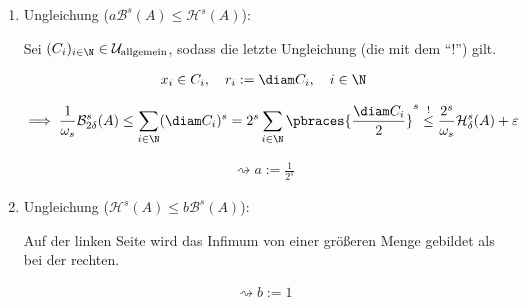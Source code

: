 \begin{solution}
\begin{enumerate}[label = \arabic*.]
    \begin{enumerate}[label = \arabic*.]

        \item Ungleichung ($a \mathcal{B}^s(A) \leq \mathcal{H}^s(A)$):
        
        Sei $(C_i)_{i \in \N} \in \mathcal{U}_\text{allgemein}$, sodass die letzte Ungleichung (die mit dem \enquote{!}) gilt.

        \begin{align*}
            x_i \in C_i,
            \quad
            r_i := \diam C_i,
            \quad
            i \in \N
        \end{align*}

        \begin{align*}
            \implies
            \frac{1}{\omega_s}
            \mathcal{B}_{2 \delta}^s(A)
            \leq
            \sum_{i \in \N}
                (\diam C_i)^s
            =
            2^s
            \sum_{i \in \N}
                \pbraces
                {
                    \frac{\diam C_i}{2}
                }^s
            \stackrel{!}{\leq}
            \frac{2^s}{\omega_s}
            \mathcal{H}_\delta^s(A) + \varepsilon
        \end{align*}

        \begin{align*}
            \rightsquigarrow
            a := \frac{1}{2^s}
        \end{align*}

        \item Ungleichung ($\mathcal{H}^s(A) \leq b \mathcal{B}^s(A)$):
        
        Auf der linken Seite wird das Infimum von einer größeren Menge gebildet als bei der rechten.
    
        \begin{align*}
            \rightsquigarrow
            b := 1
        \end{align*}

    \end{enumerate}

\end{enumerate}

\end{solution}

